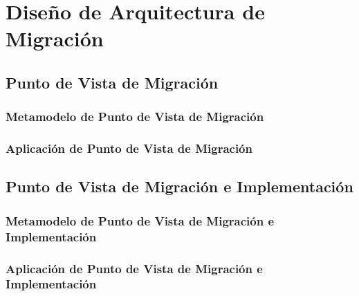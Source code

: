       \section{Diseño de Arquitectura de Migración}
      \subsection{Punto de Vista de Migración}
      \subsubsection{Metamodelo de Punto de Vista de Migración}
      \subsubsection{Aplicación de Punto de Vista de Migración}
      \subsection{Punto de Vista de Migración e Implementación}
      \subsubsection{Metamodelo de Punto de Vista de Migración e Implementación}
      \subsubsection{Aplicación de Punto de Vista de Migración e Implementación}
